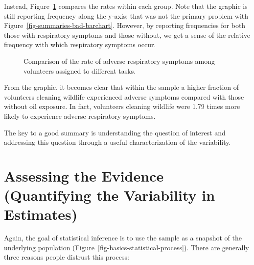 \documentclass[
  letterpaper,
  DIV=11,
  numbers=noendperiod]{scrreprt}
\theoremstyle{plain}
\theoremstyle{definition}
\theoremstyle{definition}
\theoremstyle{remark}
\begin{document}
Instead, Figure~\ref{fig-summaries-good-barchart} compares the rates
within each group. Note that the graphic is still reporting frequency
along the y-axis; that was not the primary problem with
Figure~\ref{fig-summaries-bad-barchart}. However, by reporting
frequencies for both those with respiratory symptoms and those without,
we get a sense of the relative frequency with which respiratory symptoms
occur.

\begin{figure}


\caption{\label{fig-summaries-good-barchart}Comparison of the rate of
adverse respiratory symptoms among volunteers assigned to different
tasks.}

\end{figure}%

From the graphic, it becomes clear that within the sample a higher
fraction of volunteers cleaning wildlife experienced adverse symptoms
compared with those without oil exposure. In fact, volunteers cleaning
wildlife were 1.79 times more likely to experience adverse respiratory
symptoms.

The key to a good summary is understanding the question of interest and
addressing this question through a useful characterization of the
variability.

\chapter{Assessing the Evidence (Quantifying the Variability in
Estimates)}\label{sec-samplingdistns}

Again, the goal of statistical inference is to use the sample as a
snapshot of the underlying population
(Figure~\ref{fig-basics-statistical-process}). There are generally three
reasons people distrust this process:
\end{document}

